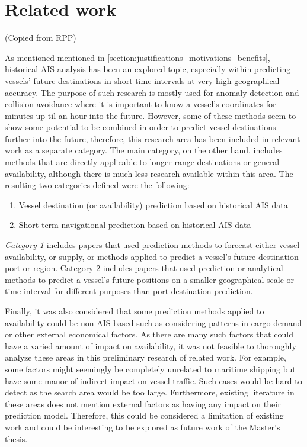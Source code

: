 \chapter{Related work}

(Copied from RPP)

As mentioned mentioned in \cref{section:justifications_motivations_benefits}, historical AIS analysis has been an explored topic, especially within predicting vessels’ future destinations in short time intervals at very high geographical accuracy. The purpose of such research is mostly used for anomaly detection and collision avoidance where it is important to know a vessel’s coordinates for minutes up til an hour into the future. However, some of these methods seem to show some potential to be combined in order to predict vessel destinations further into the future, therefore, this research area has been included in relevant work as a separate category. The main category, on the other hand, includes methods that are directly applicable to longer range destinations or general availability, although there is much less research available within this area. The resulting two categories defined were the following:

\begin{enumerate}
    \item Vessel destination (or availability) prediction based on historical AIS data
    \item Short term navigational prediction based on historical AIS data
\end{enumerate}

\textit{Category 1} includes papers that used prediction methods to forecast either vessel availability, or supply, or methods applied to predict a vessel’s future destination port or region. Category 2 includes papers that used prediction or analytical methods to predict a vessel’s future positions on a smaller geographical scale or time-interval for different purposes than port destination prediction.

Finally, it was also considered that some prediction methods applied to availability could be non-AIS based such as considering patterns in cargo demand or other external economical factors. As there are many such factors that could have a varied amount of impact on availability, it was not feasible to thoroughly analyze these areas in this preliminary research of related work. For example, some factors might seemingly be completely unrelated to maritime shipping but have some manor of indirect impact on vessel traffic. Such cases would be hard to detect as the search area would be too large. Furthermore, existing literature in these areas does not mention external factors as having any impact on their prediction model. Therefore, this could be considered a limitation of existing work and could be interesting to be explored as future work of the Master’s thesis.


